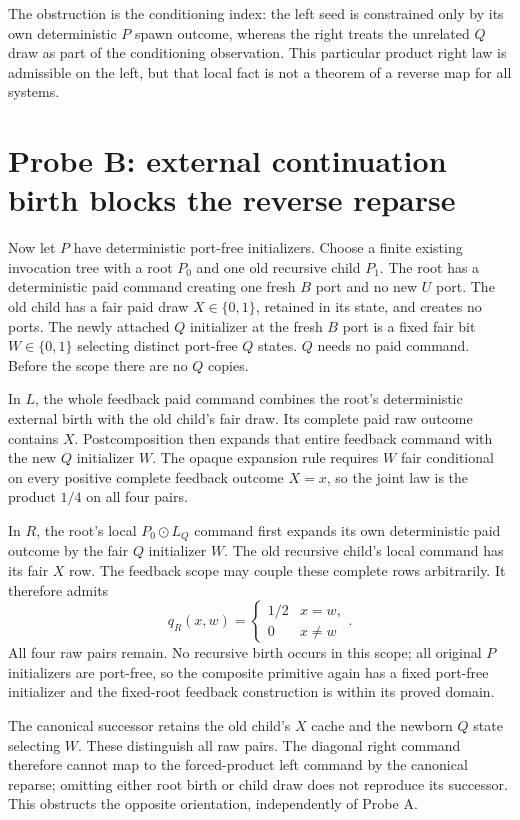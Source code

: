 \documentclass[11pt]{article}\usepackage{amsmath,amssymb,geometry}\geometry{margin=1in}
\begin{document}
The obstruction is the conditioning index: the left seed is constrained only by its own deterministic $P$ spawn outcome, whereas the right treats the unrelated $Q$ draw as part of the conditioning observation. This particular product right law is admissible on the left, but that local fact is not a theorem of a reverse map for all systems.

\section*{Probe B: external continuation birth blocks the reverse reparse}
Now let $P$ have deterministic port-free initializers. Choose a finite existing invocation tree with a root $P_0$ and one old recursive child $P_1$. The root has a deterministic paid command creating one fresh $B$ port and no new $U$ port. The old child has a fair paid draw $X\in\{0,1\}$, retained in its state, and creates no ports. The newly attached $Q$ initializer at the fresh $B$ port is a fixed fair bit $W\in\{0,1\}$ selecting distinct port-free $Q$ states. $Q$ needs no paid command. Before the scope there are no $Q$ copies.

In $L$, the whole feedback paid command combines the root's deterministic external birth with the old child's fair draw. Its complete paid raw outcome contains $X$. Postcomposition then expands that entire feedback command with the new $Q$ initializer $W$. The opaque expansion rule requires $W$ fair conditional on every positive complete feedback outcome $X=x$, so the joint law is the product $1/4$ on all four pairs.

In $R$, the root's local $P_0\odot L_Q$ command first expands its own deterministic paid outcome by the fair $Q$ initializer $W$. The old recursive child's local command has its fair $X$ row. The feedback scope may couple these complete rows arbitrarily. It therefore admits
\[
q_R(x,w)=\begin{cases}1/2&x=w,\\0&x\ne w\end{cases}.
\]
All four raw pairs remain. No recursive birth occurs in this scope; all original $P$ initializers are port-free, so the composite primitive again has a fixed port-free initializer and the fixed-root feedback construction is within its proved domain.

The canonical successor retains the old child's $X$ cache and the newborn $Q$ state selecting $W$. These distinguish all raw pairs. The diagonal right command therefore cannot map to the forced-product left command by the canonical reparse; omitting either root birth or child draw does not reproduce its successor. This obstructs the opposite orientation, independently of Probe A.
\end{document}
